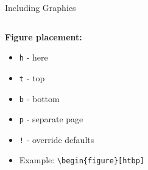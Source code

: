 \begin{frame}[fragile]{Including Graphics}
\begin{columns}
\begin{column}{0.5\textwidth}
               \textbf{Figure placement:}
               \begin{itemize}
                    \item \texttt{h} - here
                    \item \texttt{t} - top
                    \item \texttt{b} - bottom
                    \item \texttt{p} - separate page
                    \item \texttt{!} - override defaults
                    \item Example: \texttt{\textbackslash begin\{figure\}[htbp]}
               \end{itemize}
          \end{column}
     \end{columns}

\end{frame}

